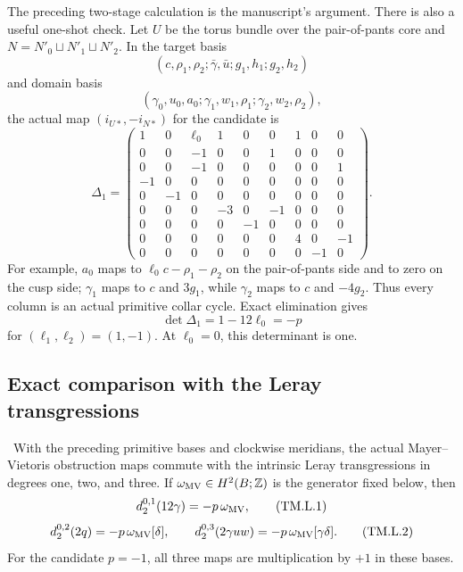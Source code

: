 \begin{remark}
\label{mapsI:top:remark:L920}
The preceding two-stage calculation is the manuscript's argument.  There is
also a useful one-shot check.  Let $U$ be the torus bundle over the
pair-of-pants core and
$N=N'_0\sqcup N'_1\sqcup N'_2$.  In the target basis
\[
(c,\rho_1,\rho_2;
 \bar\gamma,\bar u;
 g_1,h_1;g_2,h_2)
\]
and domain basis
\[
(\gamma_0,u_0,a_0;
 \gamma_1,w_1,\rho_1;
 \gamma_2,w_2,\rho_2),
\]
the actual map $(i_{U*},-i_{N*})$ for the candidate is
\[
\Delta_1=
\begin{pmatrix}
1&0&\ell_0&1&0&0&1&0&0\\
0&0&-1&0&0&1&0&0&0\\
0&0&-1&0&0&0&0&0&1\\
-1&0&0&0&0&0&0&0&0\\
0&-1&0&0&0&0&0&0&0\\
0&0&0&-3&0&-1&0&0&0\\
0&0&0&0&-1&0&0&0&0\\
0&0&0&0&0&0&4&0&-1\\
0&0&0&0&0&0&0&-1&0
\end{pmatrix}.
\tag{TM.MV.17}
\]
For example, $a_0$ maps to
$\ell_0c-\rho_1-\rho_2$ on the pair-of-pants side and to zero on the cusp
side; $\gamma_1$ maps to $c$ and $3g_1$, while $\gamma_2$ maps to $c$ and
$-4g_2$.  Thus every column is an actual primitive collar cycle.  Exact
elimination gives
\[
 \det\Delta_1=1-12\ell_0=-p
\]
for $(\ell_1,\ell_2)=(1,-1)$.  At $\ell_0=0$, this determinant is one.
\end{remark}

\subsection{Exact comparison with the Leray transgressions}

\begin{theorem}
\label{mapsI:top:thm:mv-leray-comparison}
\ With the preceding primitive bases and clockwise meridians, the
actual Mayer--Vietoris obstruction maps commute with the intrinsic Leray
transgressions in degrees one, two, and three.  If
$\omega_{\rm MV}\in H^2(B;\mathbb Z)$ is the generator fixed below, then
\[
 d_2^{0,1}(12\gamma)=-p\,\omega_{\rm MV},
\tag{TM.L.1}
\]
\[
 d_2^{0,2}(2q)=-p\,\omega_{\rm MV}[\delta],
 \qquad
 d_2^{0,3}(2\gamma uw)
   =-p\,\omega_{\rm MV}[\gamma\delta].
\tag{TM.L.2}
\]
For the candidate $p=-1$, all three maps are multiplication by $+1$ in
these bases.
\end{theorem}

